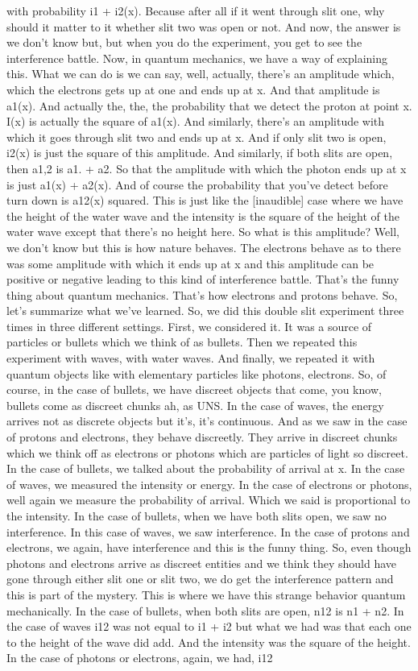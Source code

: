\documentclass{article}
\newcommand{\<}{\langle}
\renewcommand{\>}{\rangle}
\begin{document}
with probability i1 + i2(x). Because after all if it went through slit one, why should it matter to it whether slit two was open or not. And now, the answer is we don't know but, but when you do the experiment, you get to see the interference battle. Now, in quantum mechanics, we have a way of explaining this. What we can do is we can say, well, actually, there's an amplitude which, which the electrons gets up at one and ends up at x. And that amplitude is a1(x). And actually the, the, the probability that we detect the proton at point x. I(x) is actually the square of a1(x). And similarly, there's an amplitude with which it goes through slit two and ends up at x. And if only slit two is open, i2(x) is just the square of this amplitude. And similarly, if both slits are open, then a1,2 is a1. + a2. So that the amplitude with which the photon ends up at x is just a1(x) + a2(x). And of course the probability that you've detect before turn down is a12(x) squared. This is just like the [inaudible] case where we have the height of the water wave and the intensity is the square of the height of the water wave except that there's no height here. So what is this amplitude? Well, we don't know but this is how nature behaves. The electrons behave as to there was some amplitude with which it ends up at x and this amplitude can be positive or negative leading to this kind of interference battle. That's the funny thing about quantum mechanics. That's how electrons and protons behave. So, let's summarize what we've learned. So, we did this double slit experiment three times in three different settings. First, we considered it. It was a source of particles or bullets which we think of as bullets. Then we repeated this experiment with waves, with water waves. And finally, we repeated it with quantum objects like with elementary particles like photons, electrons. So, of course, in the case of bullets, we have discreet objects that come, you know, bullets come as discreet chunks ah, as UNS. In the case of waves, the energy arrives not as discrete objects but it's, it's continuous. And as we saw in the case of protons and electrons, they behave discreetly. They arrive in discreet chunks which we think off as electrons or photons which are particles of light so discreet. In the case of bullets, we talked about the probability of arrival at x. In the case of waves, we measured the intensity or energy. In the case of electrons or photons, well again we measure the probability of arrival. Which we said is proportional to the intensity. In the case of bullets, when we have both slits open, we saw no interference. In this case of waves, we saw interference. In the case of protons and electrons, we again, have interference and this is the funny thing. So, even though photons and electrons arrive as discreet entities and we think they should have gone through either slit one or slit two, we do get the interference pattern and this is part of the mystery. This is where we have this strange behavior quantum mechanically. In the case of bullets, when both slits are open, n12 is n1 + n2. In the case of waves i12 was not equal to i1 + i2 but what we had was that each one to the height of the wave did add. And the intensity was the square of the height. In the case of photons or electrons, again, we had, i12 
\end{document}
